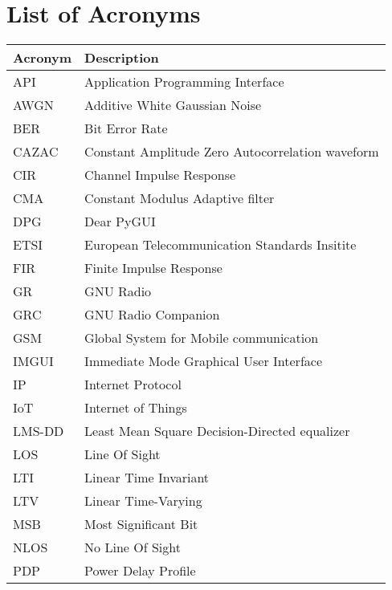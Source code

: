 \documentclass[
	overfullrule,
	paper = a4, twoside, openright, BCOR = 5mm,
	headinclude, footexclude,
	fontsize = 11pt,
	cleardoublepage = empty,
	titlepage, abstract = on,
	automark,
	numbers = noenddot
]{scrreprt}
\begin{document}
	\chapter*{List of Acronyms}
	\noindent
	\begin{tabularx}{\linewidth}{l X}
		\toprule
		\bfseries Acronym & \bfseries Description \\
		\midrule
		API    & Application Programming Interface                \\
		AWGN   & Additive White Gaussian Noise                    \\
		BER    & Bit Error Rate                                   \\
		CAZAC  & Constant Amplitude Zero Autocorrelation waveform \\
		CIR    & Channel Impulse Response                         \\
		CMA    & Constant Modulus Adaptive filter                 \\
		DPG    & Dear PyGUI                                       \\
		ETSI   & European Telecommunication Standards Insitite    \\
		FIR    & Finite Impulse Response                          \\
		GR     & GNU Radio                                        \\
		GRC    & GNU Radio Companion                              \\
		GSM    & Global System for Mobile communication           \\
		IMGUI  & Immediate Mode Graphical User Interface          \\
		IP     & Internet Protocol                                \\
		IoT    & Internet of Things                               \\
		LMS-DD & Least Mean Square Decision-Directed equalizer    \\
		LOS    & Line Of Sight                                    \\
		LTI    & Linear Time Invariant                            \\
		LTV    & Linear Time-Varying                              \\
		MSB    & Most Significant Bit                             \\
		NLOS   & No Line Of Sight                                 \\
		PDP    & Power Delay Profile                              \\

\end{tabularx}
\end{document}
